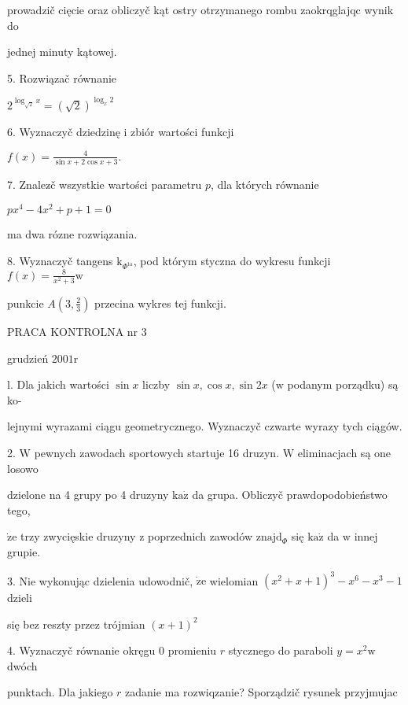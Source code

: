 \documentclass[a4paper,12pt]{article}
\begin{document}
prowadzič cięcie oraz obliczyč kąt ostry otrzymanego rombu zaokrqglajqc wynik do

jednej minuty kątowej.

5. Rozwiązač równanie

$2^{\log_{\sqrt{2}}x}=(\sqrt{2})^{\log_{x}2}$

6. Wyznaczyč dziedzinę i zbiór wartości funkcji

$f(x)=\displaystyle \frac{4}{\sin x+2\cos x+3}.$

7. Znalez$\acute{}$č wszystkie wartości parametru $p$, dla których równanie

$px^{4}-4x^{2}+p+1=0$

ma dwa rózne rozwiązania.

8. Wyznaczyč tangens $\mathrm{k}_{\Phi^{\mathrm{t}\mathrm{a}}}$, pod którym styczna do wykresu funkcji $f(x) = \displaystyle \frac{8}{x^{2}+3} \mathrm{w}$

punkcie $A(3,\displaystyle \frac{2}{3})$ przecina wykres tej funkcji.





PRACA KONTROLNA nr 3

grudzień $2001\mathrm{r}$

l. Dla jakich wartości $\sin x$ liczby $\sin x, \cos x, \sin 2x$ ($\mathrm{w}$ podanym porządku) są ko-

lejnymi wyrazami ciągu geometrycznego. Wyznaczyč czwarte wyrazy tych ciągów.

2. $\mathrm{W}$ pewnych zawodach sportowych startuje 16 druzyn. $\mathrm{W}$ eliminacjach są one losowo

dzielone na 4 grupy po 4 druzyny $\mathrm{k}\mathrm{a}\dot{\mathrm{z}}$ da grupa. Obliczyč prawdopodobieństwo tego,

$\dot{\mathrm{z}}\mathrm{e}$ trzy zwycięskie druzyny $\mathrm{z}$ poprzednich zawodów $\mathrm{z}\mathrm{n}\mathrm{a}\mathrm{j}\mathrm{d}_{\Phi}$ się $\mathrm{k}\mathrm{a}\dot{\mathrm{z}}$ da $\mathrm{w}$ innej grupie.

3. Nie wykonując dzielenia udowodnič, $\dot{\mathrm{z}}\mathrm{e}$ wielomian $(x^{2}+x+1)^{3}-x^{6}-x^{3}-1$ dzieli

się bez reszty przez trójmian $(x+1)^{2}$

4. Wyznaczyč równanie okręgu $0$ promieniu $r$ stycznego do paraboli $y=x^{2}\mathrm{w}$ dwóch

punktach. Dla jakiego $r$ zadanie ma rozwiqzanie? Sporządzič rysunek przyjmujac
\end{document}
